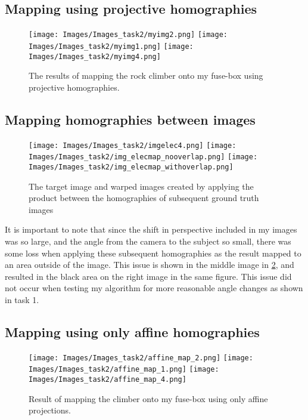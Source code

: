 \documentclass{article}
\begin{document}
\subsection{Mapping using projective homographies}
\begin{figure}[H]
    \centering
    \texttt{[image: Images/Images\_task2/myimg2.png]}
    \texttt{[image: Images/Images\_task2/myimg1.png]}
    \texttt{[image: Images/Images\_task2/myimg4.png]}
    \caption{The results of mapping the rock climber onto my fuse-box using projective homographies.}
    \label{fig:enter-label}
\end{figure}

\subsection{Mapping homographies between images}
\begin{figure}[H]
    \centering
    \texttt{[image: Images/Images\_task2/imgelec4.png]}
    \texttt{[image: Images/Images\_task2/img\_elecmap\_nooverlap.png]}
    \texttt{[image: Images/Images\_task2/img\_elecmap\_withoverlap.png]}
    \caption{The target image and warped images created by applying the product between the homographies of subsequent ground truth images}
    \label{fig:myimages-mapping}
\end{figure}
It is important to note that since the shift in perspective included in my images was so large, and the angle from the camera to the subject so small, there was some loss when applying these subsequent homographies as the result mapped to an area outside of the image. This issue is shown in the middle image in \ref{fig:myimages-mapping}, and resulted in the black area on the right image in the same figure. This issue did not occur when testing my algorithm for more reasonable angle changes as shown in task 1.

\subsection{Mapping using only affine homographies}
\begin{figure}[H]
    \centering
    \texttt{[image: Images/Images\_task2/affine\_map\_2.png]}
    \texttt{[image: Images/Images\_task2/affine\_map\_1.png]}
    \texttt{[image: Images/Images\_task2/affine\_map\_4.png]}
    \caption{Result of mapping the climber onto my fuse-box using only affine projections.}
    \label{fig:my-affine}
\end{figure}
\end{document}
